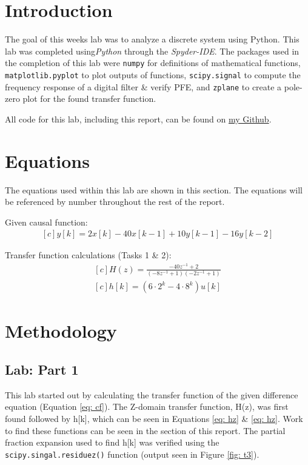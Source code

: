 \documentclass[12pt]{report}
\begin{document}
\section{Introduction}
The goal of this weeks lab was to analyze a discrete system using Python. 
This lab was completed using\textit{Python} through the \textit{Spyder-IDE}. The packages used in the completion 
of this lab were \texttt{numpy} for definitions of mathematical functions, \texttt{matplotlib.pyplot} to plot outputs 
of functions, \texttt{scipy.signal} to compute the frequency response of a digital filter \& verify PFE, and \texttt{zplane} 
to create a pole-zero plot for the found transfer function.

All code for this lab, including this report, can be found on \href{http://github.com/mac-edmondson}{my Github}.
\section{Equations}\label{section: eq}
The equations used within this lab are shown in this section. The equations will be referenced by number throughout
the rest of the report.

Given causal function:
\begin{equation}\label{eq: cf} %
  \begin{aligned}[c]
    y[k] = 2x[k] - 40x[k-1] + 10y[k-1] - 16y[k-2] 
  \end{aligned}
\end{equation}

Transfer function calculations (Tasks 1 \& 2):
\begin{equation}\label{eq: hz} %
  \begin{aligned}[c]
    H(z) = \frac{-40z^{-1} + 2}{(-8z^{-1}+1)(-2z^{-1}+1)} 
  \end{aligned}
\end{equation}
\begin{equation}\label{eq: hk}
  \begin{aligned}[c]
    h[k] = (6\cdot 2^k - 4\cdot 8^k)u[k]
  \end{aligned}
\end{equation}


\section{Methodology}
\subsection{Lab: Part 1}\label{Section: Part1}
This lab started out by calculating the transfer function of the given difference equation (Equation \eqref{eq: cf}). The
Z-domain transfer function, H(z), was first found followed by h[k], which can be seen in Equations \eqref{eq: hz} \& \eqref{eq: hz}.
Work to find these functions can be seen in the  section of this report. The partial fraction expansion
used to find h[k] was verified using the \texttt{scipy.singal.residuez()} function (output seen in Figure \ref{fig: t3}). 
\end{document}
